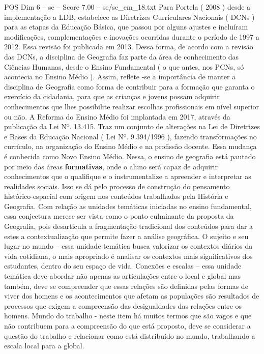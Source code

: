 \begin{textsample}{POS Dim 6 – se – Score 7.00 – se/se\_em\_18.txt}
Para Portela ( 2008 ) desde a implementação a LDB, estabelece as Diretrizes Curriculares Nacionais ( DCNs ) para as etapas da Educação Básica, que passou por alguns ajustes e incluíram modificações, complementações e inovações ocorridas durante o período de 1997 a 2012.
Essa revisão foi publicada em 2013.
Dessa forma, de acordo com a revisão das DCNs, a disciplina de Geografia faz parte da área de conhecimento das Ciências Humanas, desde o Ensino Fundamental ( o que antes, nos PCNs, só acontecia no Ensino Médio ).
Assim, reflete -se a importância de manter a disciplina de Geografia como forma de contribuir para a formação que garanta o exercício da cidadania, para que as crianças e jovens possam adquirir conhecimentos que lhes possibilite realizar escolhas profissionais em nível superior ou não.
A Reforma do Ensino Médio foi implantada em 2017, através da publicação da Lei Nº. 13.415.
Traz um conjunto de alterações na Lei de Diretrizes e Bases da Educação Nacional ( Lei Nº. 9.394/1996 ), fazendo transformações no currículo, na organização do Ensino Médio e na profissão docente.
Essa mudança é conhecida como Novo Ensino Médio.
Nessa, o ensino de geografia está pautado por meio das áreas \textbf{formativas}, onde o aluno será capaz de adquirir conhecimentos que o qualifique e o instrumentalize a apreender e interpretar as realidades sociais.
Isso se dá pelo processo de construção do pensamento histórico-espacial com origem nos conteúdos trabalhados pela História e Geografia.
Com relação as unidades temáticas iniciadas no ensino fundamental, essa conjectura merece ser vista como o ponto culminante da proposta da Geografia, pois desarticula a fragmentação tradicional dos conteúdos para dar a estes a contextualização que permite fazer a análise geográfica.
O sujeito e seu lugar no mundo – essa unidade temática busca valorizar os contextos diários da vida cotidiana, o mais apropriado é analisar os contextos mais significativos dos estudantes, dentro do seu espaço de vida.
Conexões e escalas – essa unidade temática deve abordar não apenas as articulações entre o local e global mas também, deve se compreender que essas relações são definidas pelas formas de viver dos homens e os acontecimentos que afetam as populações são resultados de processos que exigem a compreensão das desigualdades das relações entre os homens.
Mundo do trabalho - neste item há muitos termos que são vagos e que não contribuem para a compreensão do que está proposto, deve se considerar a questão do trabalho e relacionar como está distribuído no mundo, trabalhando a escala local para a global.

\end{textsample}
